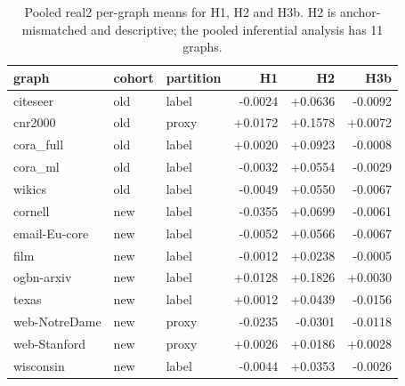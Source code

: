 \begin{table}[t]
\centering
\scriptsize
\caption{Pooled real2 per-graph means for H1, H2 and H3b. H2 is anchor-mismatched and descriptive; the pooled inferential analysis has 11 graphs.}
\label{tab:v2real2}
\begin{tabular}{@{}lllrrr@{}}\toprule
graph & cohort & partition & H1 & H2 & H3b \\
\midrule
citeseer & old & label & -0.0024 & +0.0636 & -0.0092 \\
cnr2000 & old & proxy & +0.0172 & +0.1578 & +0.0072 \\
cora\_full & old & label & +0.0020 & +0.0923 & -0.0008 \\
cora\_ml & old & label & -0.0032 & +0.0554 & -0.0029 \\
wikics & old & label & -0.0049 & +0.0550 & -0.0067 \\
cornell & new & label & -0.0355 & +0.0699 & -0.0061 \\
email-Eu-core & new & label & -0.0052 & +0.0566 & -0.0067 \\
film & new & label & -0.0012 & +0.0238 & -0.0005 \\
ogbn-arxiv & new & label & +0.0128 & +0.1826 & +0.0030 \\
texas & new & label & +0.0012 & +0.0439 & -0.0156 \\
web-NotreDame & new & proxy & -0.0235 & -0.0301 & -0.0118 \\
web-Stanford & new & proxy & +0.0026 & +0.0186 & +0.0028 \\
wisconsin & new & label & -0.0044 & +0.0353 & -0.0026 \\
\bottomrule\end{tabular}
\end{table}
